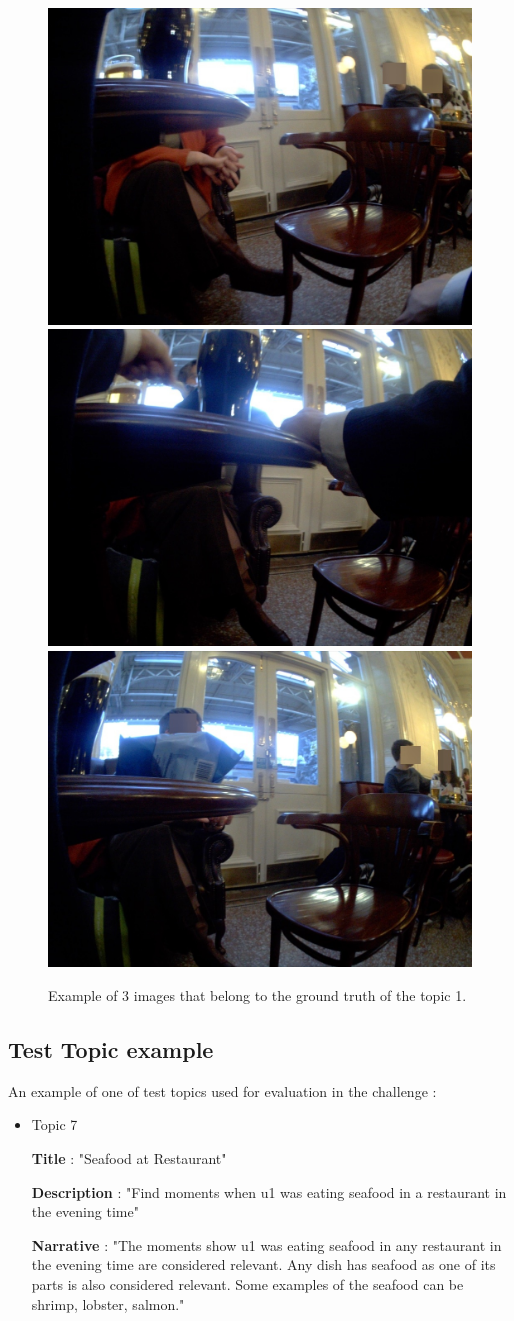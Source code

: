     \begin{figure}[H]
        \centering
        \captionsetup{justification=centering}
        \includegraphics[width=.3\linewidth]{Sections/5ImageClef/images/example.jpg}
        \includegraphics[width=.3\linewidth]{Sections/5ImageClef/images/example1.jpg}
        \includegraphics[width=.3\linewidth]{Sections/5ImageClef/images/example3.jpg}
        \caption{Example of 3 images that belong to the ground truth of the topic 1.}
    \end{figure}      

    \newpage


    \subsection{Test Topic example}

    An example of one of test topics used for evaluation in the challenge :

        \begin{itemize}

        \item Topic 7
        

        \textbf{Title} : "Seafood at Restaurant"

        \textbf{Description} : "Find moments when u1 was eating seafood in a restaurant in the evening time"

        \textbf{Narrative} : "The moments show u1 was eating seafood in any restaurant in the evening time are considered relevant. Any dish has seafood as one of its parts is also considered relevant. Some examples of the seafood can be shrimp, lobster, salmon."

        \end{itemize}
     
